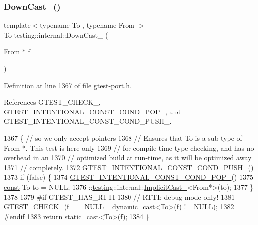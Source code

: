 \mbox{\label{namespacetesting_1_1internal_a1a1a1aed3fe00908b8a45d5ab4a33665}} 
\subsubsection{\texorpdfstring{Down\+Cast\+\_\+()}{DownCast\_()}}
{\footnotesize\ttfamily template$<$typename To , typename From $>$ \\
To testing\+::internal\+::\+Down\+Cast\+\_\+ (\begin{DoxyParamCaption}\item[{From $\ast$}]{f }\end{DoxyParamCaption})\hspace{0.3cm}{\ttfamily [inline]}}



Definition at line 1367 of file gtest-\/port.\+h.



References G\+T\+E\+S\+T\+\_\+\+C\+H\+E\+C\+K\+\_\+, G\+T\+E\+S\+T\+\_\+\+I\+N\+T\+E\+N\+T\+I\+O\+N\+A\+L\+\_\+\+C\+O\+N\+S\+T\+\_\+\+C\+O\+N\+D\+\_\+\+P\+O\+P\+\_\+, and G\+T\+E\+S\+T\+\_\+\+I\+N\+T\+E\+N\+T\+I\+O\+N\+A\+L\+\_\+\+C\+O\+N\+S\+T\+\_\+\+C\+O\+N\+D\+\_\+\+P\+U\+S\+H\+\_\+.


\begin{DoxyCode}
1367                              \{  \textcolor{comment}{// so we only accept pointers}
1368   \textcolor{comment}{// Ensures that To is a sub-type of From *.  This test is here only}
1369   \textcolor{comment}{// for compile-time type checking, and has no overhead in an}
1370   \textcolor{comment}{// optimized build at run-time, as it will be optimized away}
1371   \textcolor{comment}{// completely.}
1372   \hyperlink{gtest-port_8h_a69b0cadb05bf2a1ef96151243c6b6241}{GTEST\_INTENTIONAL\_CONST\_COND\_PUSH\_}()
1373   if (false) \{
1374   \hyperlink{gtest-port_8h_ad115e2c466f7e8a32f1cf23ef2e5f220}{GTEST\_INTENTIONAL\_CONST\_COND\_POP\_}()
1375     \hyperlink{namespaceupload_a985aa9a71de3eb507344df65700c696d}{const} To to = NULL;
1376     ::\hyperlink{namespacetesting}{testing}::internal::\hyperlink{namespacetesting_1_1internal_a982df3f369643b175f79cda4048bc3b9}{ImplicitCast\_}<From*>(to);
1377   \}
1378 
1379 \textcolor{preprocessor}{#if GTEST\_HAS\_RTTI}
1380   \textcolor{comment}{// RTTI: debug mode only!}
1381   \hyperlink{gtest-port_8h_ab54343f0a36dc4cb0ce8a478dd7847b8}{GTEST\_CHECK\_}(f == NULL || dynamic\_cast<To>(f) != NULL);
1382 \textcolor{preprocessor}{#endif}
1383   \textcolor{keywordflow}{return} \textcolor{keyword}{static\_cast<}To\textcolor{keyword}{>}(f);
1384 \}
\end{DoxyCode}
\mbox{\label{namespacetesting_1_1internal_a08725846ff184d3e79bcf5be4df19157}} 
